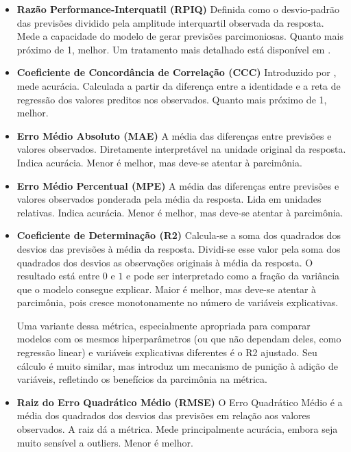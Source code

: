 \begin{itemize}
    \item \textbf{Razão Performance-Interquatil (RPIQ)} \newline
    Definida como o desvio-padrão das previsões dividido pela amplitude interquartil observada da resposta. Mede a capacidade do modelo de gerar previsões parcimoniosas. Quanto mais próximo de 1, melhor. Um tratamento mais detalhado está disponível em .
    
    \item \textbf{Coeficiente de Concordância de Correlação (CCC)} \newline
    Introduzido por , mede acurácia. Calculada a partir da diferença entre a identidade e a reta de regressão dos valores preditos nos observados. Quanto mais próximo de 1, melhor.
    
    \item \textbf{Erro Médio Absoluto (MAE)} \newline
    A média das diferenças entre previsões e valores observados. Diretamente interpretável na unidade original da resposta. Indica acurácia. Menor é melhor, mas deve-se atentar à parcimônia.
    
    \item \textbf{Erro Médio Percentual (MPE)} \newline
    A média das diferenças entre previsões e valores observados ponderada pela média da resposta. Lida em unidades relativas. Indica acurácia. Menor é melhor, mas deve-se atentar à parcimônia.
    
    \item \textbf{Coeficiente de Determinação (R2)} \newline
    Calcula-se a soma dos quadrados dos desvios das previsões à média da resposta. Dividi-se esse valor pela soma dos quadrados dos desvios as observações originais à média da resposta. O resultado está entre $0$ e $1$ e pode ser interpretado como a fração da variância que o modelo consegue explicar. Maior é melhor, mas deve-se atentar à parcimônia, pois cresce monotonamente no número de variáveis explicativas.
    
    Uma variante dessa métrica, especialmente apropriada para comparar modelos com os mesmos hiperparâmetros (ou que não dependam deles, como regressão linear) e variáveis explicativas diferentes é o R2 ajustado. Seu cálculo é muito similar, mas introduz um mecanismo de punição à adição de variáveis, refletindo os benefícios da parcimônia na métrica.
    
    
    \item \textbf{Raiz do Erro Quadrático Médio (RMSE)} \newline
    O Erro Quadrático Médio é a média dos quadrados dos desvios das previsões em relação aos valores observados. A raiz dá a métrica. Mede principalmente acurácia, embora seja muito sensível a outliers. Menor é melhor.
    
\end{itemize}

